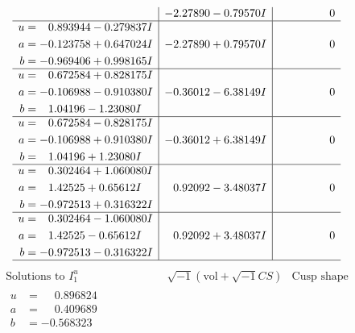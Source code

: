 \documentclass[1p]{elsarticle_modified}
\theoremstyle{definition}
\newcommand{\I}{\sqrt{-1}}
\begin{document}
$$\begin{array}{c|c|c}
 & -2.27890 - 0.79570 I & \phantom{-0.000000 } 0 \\ \hline\begin{aligned}
u &= \phantom{-}0.893944 - 0.279837 I \\
a &= -0.123758 + 0.647024 I \\
b &= -0.969406 + 0.998165 I\end{aligned}
 & -2.27890 + 0.79570 I & \phantom{-0.000000 } 0 \\ \hline\begin{aligned}
u &= \phantom{-}0.672584 + 0.828175 I \\
a &= -0.106988 - 0.910380 I \\
b &= \phantom{-}1.04196 - 1.23080 I\end{aligned}
 & -0.36012 - 6.38149 I & \phantom{-0.000000 } 0 \\ \hline\begin{aligned}
u &= \phantom{-}0.672584 - 0.828175 I \\
a &= -0.106988 + 0.910380 I \\
b &= \phantom{-}1.04196 + 1.23080 I\end{aligned}
 & -0.36012 + 6.38149 I & \phantom{-0.000000 } 0 \\ \hline\begin{aligned}
u &= \phantom{-}0.302464 + 1.060080 I \\
a &= \phantom{-}1.42525 + 0.65612 I \\
b &= -0.972513 + 0.316322 I\end{aligned}
 & \phantom{-}0.92092 - 3.48037 I & \phantom{-0.000000 } 0 \\ \hline\begin{aligned}
u &= \phantom{-}0.302464 - 1.060080 I \\
a &= \phantom{-}1.42525 - 0.65612 I \\
b &= -0.972513 - 0.316322 I\end{aligned}
 & \phantom{-}0.92092 + 3.48037 I & \phantom{-0.000000 } 0\\
 \hline 
 \end{array}$$\newpage$$\begin{array}{c|c|c}  
\text{Solutions to }I^u_{1}& \I (\text{vol} + \sqrt{-1}CS) & \text{Cusp shape}\\
 \hline 
\begin{aligned}
u &= \phantom{-}0.896824\phantom{ +0.000000I} \\
a &= \phantom{-}0.409689\phantom{ +0.000000I} \\
b &= -0.568323\phantom{ +0.000000I}\end{aligned}

\end{array}$$
\end{document}
